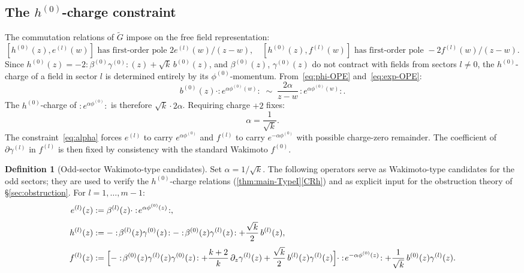 \documentclass[12pt]{article}
\theoremstyle{plain}
\theoremstyle{definition}
\newtheorem{definition}[theorem]{Definition}
\theoremstyle{remark}
\newcommand{\gtil}{\widetilde{G}}
\newcommand{\bl}[1]{\beta^{(#1)}}
\newcommand{\gl}[1]{\gamma^{(#1)}}
\newcommand{\el}[1]{e^{(#1)}}
\newcommand{\hl}[1]{h^{(#1)}}
\newcommand{\fl}[1]{f^{(#1)}}
\newcommand{\OPE}{\sim}
\newcommand{\no}[1]{:\!#1\!:}
\begin{document}
\subsection{The \texorpdfstring{$h^{(0)}$}{h0}-charge constraint}
The commutation relations of $\gtil$ impose on the free field representation:
\[
  [\hl{0}(z),\el{l}(w)]\text{ has first-order pole }2\el{l}(w)/(z-w),\quad
  [\hl{0}(z),\fl{l}(w)]\text{ has first-order pole }-2\fl{l}(w)/(z-w).
\]
Since $\hl{0}(z)=-2\no{\bl{0}\gl{0}}(z)+\sqrt{k}\,b^{(0)}(z)$, and
$\bl{0}(z)$, $\gl{0}(z)$ do not contract with fields from sectors $l\neq 0$,
the $h^{(0)}$-charge of a field in sector $l$ is determined entirely by its
$\phi^{(0)}$-momentum.
From~\eqref{eq:phi-OPE} and~\eqref{eq:exp-OPE}:
\[
  b^{(0)}(z)\cdot\no{e^{\alpha\phi^{(0)}(w)}}
  \;\OPE\; \frac{2\alpha}{z-w}\,\no{e^{\alpha\phi^{(0)}(w)}}.
\]
The $h^{(0)}$-charge of $\no{e^{\alpha\phi^{(0)}}}$ is therefore $\sqrt{k}\cdot 2\alpha$.
Requiring charge $+2$ fixes:
\begin{equation}\label{eq:alpha}
  \alpha = \frac{1}{\sqrt{k}}.
\end{equation}
The constraint~\eqref{eq:alpha} forces $e^{(l)}$ to carry $e^{\alpha\phi^{(0)}}$
and $f^{(l)}$ to carry $e^{-\alpha\phi^{(0)}}$ with possible charge-zero remainder.
The coefficient of $\partial\gamma^{(l)}$ in $f^{(l)}$ is then fixed by consistency
with the standard Wakimoto $f^{(0)}$.
\begin{definition}[Odd-sector Wakimoto-type candidates]\label{def:odd-vertex}
  Set $\alpha=1/\sqrt{k}$.
  The following operators serve as Wakimoto-type candidates for the odd sectors;
  they are used to verify the $h^{(0)}$-charge relations
  (\cref{thm:main-TypeI}\ref{CRh}) and as explicit input for the obstruction
  theory of \S\ref{sec:obstruction}.
  For $l=1,\ldots,m-1$:
  \begin{align}
    \el{l}(z)&:=\bl{l}(z)\cdot\no{e^{\alpha\phi^{(0)}(z)}},\label{eq:el}\\[3pt]
    \hl{l}(z)&:=-\no{\bl{l}(z)\gl{0}(z)}-\no{\bl{0}(z)\gl{l}(z)}
               +\frac{\sqrt{k}}{2}\,b^{(l)}(z),\label{eq:hl}\\[3pt]
    \fl{l}(z)&:=\Bigl[
               -\no{\bl{0}(z)\gl{l}(z)\gl{0}(z)}
               +\frac{k+2}{k}\,\partial_z\gl{l}(z)
               +\frac{\sqrt{k}}{2}\,b^{(l)}(z)\gl{l}(z)
              \Bigr]\cdot\no{e^{-\alpha\phi^{(0)}(z)}}
              +\frac{1}{\sqrt{k}}\,b^{(0)}(z)\gl{l}(z).\label{eq:fl}
  \end{align}
\end{definition}
\end{document}
